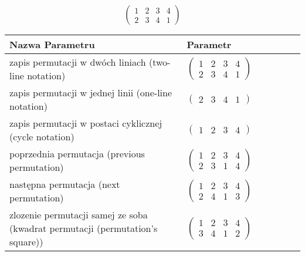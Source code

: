 \documentclass[12pt]{article}
\begin{document}
\subsection{}
\begin{center}
\[
\begin{pmatrix}
	1 & 2 & 3 & 4 \\ 
	2 & 3 & 4 & 1 
\end{pmatrix}
\]

\begin{tabular}{|m{0.6\linewidth}|m{0.4\linewidth}|}
	\hline
	Nazwa Parametru & Parametr \\
	\hline
	zapis permutacji w dwóch liniach (two-line notation) & $\begin{pmatrix} 1 & 2 & 3 & 4 \\ 
2 & 3 & 4 & 1 \end{pmatrix}$ \\ 
	\hline
	zapis permutacji w jednej linii (one-line notation) & $\begin{pmatrix} 2 & 3 & 4 & 1 \end{pmatrix}$ \\ 
	\hline
	zapis permutacji w postaci cyklicznej (cycle notation) & $\begin{pmatrix} 1 & 2 & 3 & 4 \end{pmatrix} $ \\ 
	\hline
	poprzednia permutacja (previous permutation) & $\begin{pmatrix} 1 & 2 & 3 & 4 \\ 
2 & 3 & 1 & 4 \end{pmatrix}$ \\ 
	\hline
	następna permutacja (next permutation) & $\begin{pmatrix} 1 & 2 & 3 & 4 \\ 
2 & 4 & 1 & 3 \end{pmatrix}$ \\ 
	\hline
	zlozenie permutacji samej ze soba (kwadrat permutacji (permutation's square)) & $\begin{pmatrix} 1 & 2 & 3 & 4 \\ 
3 & 4 & 1 & 2 \end{pmatrix}$ \\ 
	\hline
\end{tabular}
\end{center}
\end{document}
